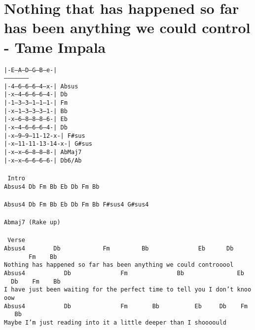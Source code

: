 \newpage
\section{Nothing that has happened so far has been anything we could control - Tame Impala}
\label{Nothing that has happened so far has been anything we could control - Tame Impala}
\texttt{|-E--A--D--G--B--e-|\\
--------------------\\
|-4--6--6--6--4--x-|\ Absus\\
|-x--4--6--6--6--4-|\ Db\\
|-1--3--3--1--1--1-|\ Fm\\
|-x--1--3--3--3--1-|\ Bb\\
|-x--6--8--8--8--6-|\ Eb\\
|-x--4--6--6--6--4-|\ Db\\
|-x--9--9--11-12-x-|\ F\#sus\\
|-x--11-11-13-14-x-|\ G\#sus\\
|-x--x--6--8--8--8-|\ AbMaj7\\
|-x--x--6--6--6--6-|\ Db6/Ab\\
\\
\lbrack\ Intro\rbrack\ \\
Absus4\ Db\ Fm\ Bb\ Eb\ Db\ Fm\ Bb\ \\
\\
Absus4\ Db\ Fm\ Bb\ Eb\ Db\ Fm\ Bb\ F\#sus4\ G\#sus4\\
\\
Abmaj7 (Rake up)\\
\\
\lbrack\ Verse\rbrack\\
Absus4\ \ \ \ \ \ \ \ Db\ \ \ \ \ \ \ \ \ \ \ \ Fm\ \ \ \ \ \ \ \ \ Bb\ \ \ \ \ \ \ \ \ \ \ \ \ \ Eb\ \ \ \ \ \ Db\ \ \ \ \ \ \ \ \ \ \ \ Fm\ \ \ \ Bb\\
Nothing\ has\ happened\ so\ far\ has\ been\ anything\ we\ could\ controoool\\
Absus4\ \ \ \ \ \ \ \ \ \ \ Db\ \ \ \ \ \ \ \ \ \ \ \ \ \ Fm\ \ \ \ \ \ \ \ \ \ \ \ \ \ Bb\ \ \ \ \ \ \ \ \ \ \ \ \ \ \ Eb\ \ \ \ Db\ \ \ \ Fm\ \ \ \ Bb\\
I\ have\ just\ been\ waiting\ for\ the\ perfect\ time\ to\ tell\ you\ I\ don't\ knoooow\\
Absus4\ \ \ \ \ \ \ \ \ \ \ Db\ \ \ \ \ \ \ \ \ \ \ \ \ \ Fm\ \ \ \ \ \ \ Bb\ \ \ \ \ \ \ \ \ \ Eb\ \ \ \ \ Db\ \ \ \ Fm\ \ \ \ Bb\\
Maybe\ I'm\ just\ reading\ into\ it\ a\ little\ deeper\ than\ I\ shoooould\\
}
